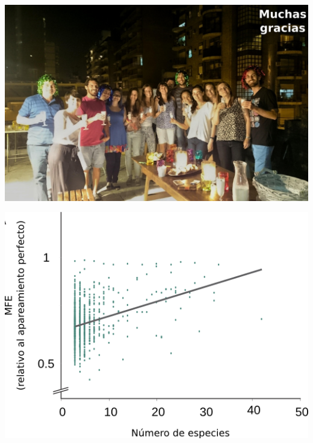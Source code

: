 \documentclass{beamer}
\begin{document}
\begin{frame}{}
	\begin{center}
		\includegraphics[width=1\textwidth]{img/agradecimientos01.png}
	\end{center}
\end{frame}




\begin{frame}{}
	\begin{center}
	\end{center}
\end{frame}

\begin{frame}{}
	\begin{center}
		\includegraphics[width=.5\textwidth]{img/extras/NAR_fig3A.png}
	\end{center}
\end{frame}
\end{document}
